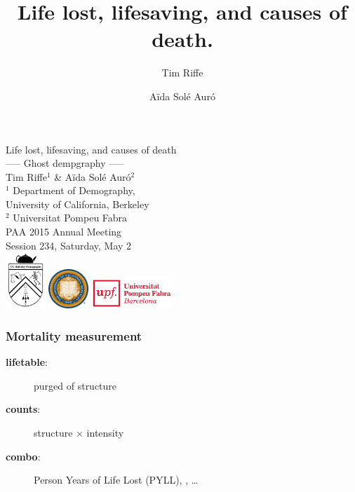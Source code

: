\documentclass{beamer}
\title[Years Lost]{Life lost, lifesaving, and causes of death.}
\author[Riffe \& Sol\'{e}]
{
Tim Riffe \inst{1} \and A{\"i}da Sol\'{e} Aur\'{o} \inst{2}}
\institute %
{
  \inst{1}%
  Department of Demography, \\
  University of California, Berkeley \\
  \and
  \inst{2} Universitat Pompeu Fabra
}
\begin{document}

\begin{frame}[plain]

\vspace{3em}
\LARGE Life lost, lifesaving, and causes of death\\
----- Ghost dempgraphy -----\\
\vspace{3 mm}
\normalsize Tim Riffe$^1$ \& A{\"i}da Sol\'{e} Aur\'{o}$^2$\\
\vspace{3 mm}
 $^1$ Department of Demography, \\
  \hspace{2mm} University of California, Berkeley \\
  $^2$ Universitat Pompeu Fabra\\
  \vspace{5 mm}
  PAA 2015 Annual Meeting \\
  Session 234, Saturday, May 2\\
  \vspace{5 mm}
  \includegraphics[width=1.5cm]{Figures/demogcrest}\hspace{.5cm}
  \includegraphics[width=1.5cm]{Figures/ucbseal1}\hspace{3cm}
  \includegraphics[height=1.2cm]{Figures/UPFcmyk}
\end{frame}

\begin{frame}
\frametitle{Mortality measurement}
\begin{description}
\item[\textbf{lifetable}:] purged of structure
\item[\textbf{counts}:] structure $\times$ intensity
\item[\textbf{combo}:] Person Years of Life Lost (PYLL),
\underline{\hspace{1cm}},
\ldots
\end{description}

\end{frame}
\end{document}
